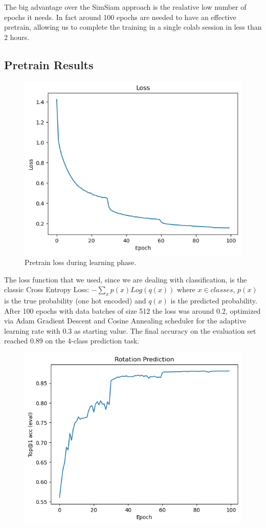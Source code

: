 \documentclass{article}
\begin{document}
\begin{flushleft}
The big advantage over the SimSiam approach is the realative low number of epochs it needs. 
In fact around 100 epochs are needed to have an effective pretrain, allowing us to complete the training in a 
single colab session in less than 2 hours.
\subsection{Pretrain Results}
\begin{figure}[h]
    \centering
    \includegraphics[scale=0.63]{pretrain_loss}
    \caption{ Pretrain loss during learning phase. }
\end{figure}
The loss function that we used, since we are dealing with classification, is the classic Cross Entropy Loss: $ -\sum_x{p(x)Log(q(x))}$ where $x \in classes$, $p(x)$ is the true probability (one hot encoded) and 
$q(x)$ is the predicted probability. After 100 epochs with data batches of size 512 the loss was around 0.2, optimized via Adam Gradient Descent and Cosine Annealing scheduler for the adaptive learning rate with 0.3 as starting value.
The final accuracy on the evaluation set reached 0.89 on the 4-class prediction task.
\begin{figure}[h]
    \centering
    \includegraphics[scale=0.65]{pretrain_acc}

\end{figure}
\end{flushleft}
\end{document}
